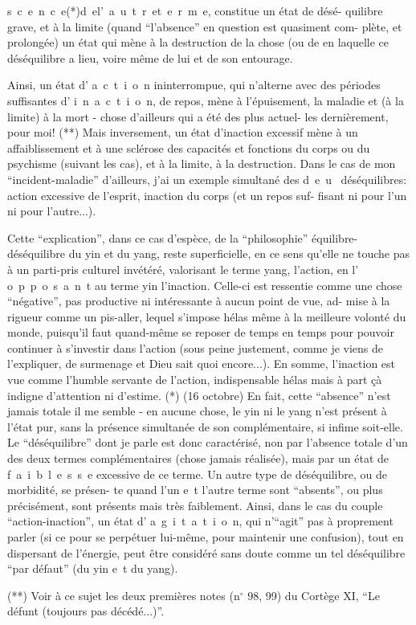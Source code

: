 \mbox{s c e n c e}\quad (*)\quad \mbox{d e\quad l' a u t r e\quad t e r m e}, constitue un état de désé-
quilibre grave, et à la limite (quand ``l'absence'' en question est quasiment com-
plète, et prolongée) un état qui mène à la destruction de la chose (ou de 
en laquelle ce déséquilibre a lieu, voire même de lui et de son entourage.

Ainsi, un état d' \mbox{a c t i o n} ininterrompue, qui n'alterne avec des
périodes suffisantes d' \mbox{i n a c t i o n}, de repos, mène à l'épuisement, la
maladie et (à la limite) à la mort - chose d'ailleurs qui a été des plus actuel-
les dernièrement, pour moi! (**) Mais inversement, un état d'inaction excessif
mène à un affaiblissement et à une sclérose des capacités et fonctions du corps
ou du psychisme (suivant les cas), et à la limite, à la destruction. Dans le
cas de mon ``incident-maladie'' d'ailleurs, j'ai un exemple simultané des \mbox{d e u }
déséquilibres: action excessive de l'esprit, inaction du corps (et un repos suf-
fisant ni pour l'un ni pour l'autre...).

Cette ``explication'', dans ce cas d'espèce, de la ``philosophie'' équilibre-
déséquilibre du yin et du yang, reste superficielle, en ce sens qu'elle ne
touche pas à un parti-pris culturel invétéré, valorisant le terme yang, l'action,
en l' \mbox{o p p o s a n t} au terme yin\inserted{,} l'inaction. Celle-ci est ressentie comme
une chose ``négative'', pas productive ni intéressante à aucun point de vue, ad-
mise à la rigueur comme un pis-aller, lequel s'impose hélas même à la meilleure
volonté du monde, puisqu'il faut quand-même se reposer de temps en temps pour
pouvoir continuer à s'investir dans l'action (sous peine justement, comme je
viens de l'expliquer, de surmenage et Dieu sait quoi encore...). En somme,
l'inaction est vue comme l'humble servante de l'action, indispensable hélas mais
à part çà indigne d'attention ni d'estime.
(*) (16 octobre) En fait, cette ``absence'' n'est jamais totale il me semble -
en aucune chose, le yin ni le yang n'est présent à l'état pur, sans la présence
simultanée de son complémentaire, si infime soit-elle. Le ``déséquilibre'' dont
je parle est donc caractérisé, non par l'absence totale d'un des deux termes
complémentaires (chose jamais réalisée), mais par un état de \mbox{f a i b l e s s e}
excessive de ce terme. Un autre type de déséquilibre, ou de morbidité, se présen-
te quand l'un \mbox{e t} l'autre terme sont ``absents'', ou plus précisément, sont
présents mais très faiblement. Ainsi, dans le cas du couple ``action-inaction'',
un état d' \mbox{a g i t a t i o n}, qui n'``agit'' pas à proprement parler (si ce 
pour se perpétuer lui-même, pour maintenir une confusion), tout en dispersant de
l'énergie, peut être considéré sans doute comme un tel déséquilibre ``par défaut''
(du yin \mbox{e t} du yang).

(**) Voir à ce sujet les deux premières notes (n$^\circ$ 98, 99) du Cortège XI, ``Le
défunt (toujours pas décédé...)''.
\margin{-}
